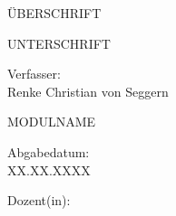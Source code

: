 \documentclass[oneside, a4paper, 12pt, titlepage]{report}
\begin{document}
\begin{titlepage}

\begin{center}

\vspace*{5cm}

{\LARGE ÜBERSCHRIFT \par}
{\Large  UNTERSCHRIFT \par}

\vspace{2cm}

{\large Verfasser:\\ Renke Christian von Seggern \par}

\vspace{2cm}

{\normalsize MODULNAME \par}

\vspace{0.5cm}

{\normalsize Abgabedatum: \\ XX.XX.XXXX \par}

\vspace{0.5cm}

{\normalsize Dozent(in): \\  \par}

\end{center}

\end{titlepage}

\newpage

\thispagestyle{empty} %
\mbox{}


\pagestyle{standard}


{
\renewcommand{\MakeUppercase}[1]{#1} %

\singlespacing %

\tableofcontents

}

\end{document}
